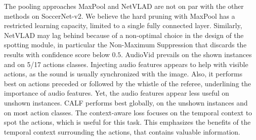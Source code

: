 \documentclass[final]{cvsports}
\begin{document}
The pooling approaches MaxPool and NetVLAD are not on par with the other methods on SoccerNet-v2. We believe the hard pruning with MaxPool has a restricted learning capacity, limited to a single fully connected layer. Similarly, NetVLAD may lag behind because of a non-optimal choice in the design of the spotting module, in particular the Non-Maximum Suppression that discards the results with confidence score below $0.5$. AudioVid prevails on the shown instances and on 5/17 actions classes. Injecting audio features appears to help with visible actions, as the sound is usually synchronized with the image. Also, it performs best on actions preceded or followed by the whistle of the referee, underlining the importance of audio features. Yet, the audio features appear less useful on unshown instances. 
CALF performs best globally, on the unshown instances and on most action classes. The context-aware loss focuses on the temporal context to spot the actions, which is useful for this task. This emphasizes the benefits of the temporal context surrounding the actions, that contains valuable information.
\end{document}
